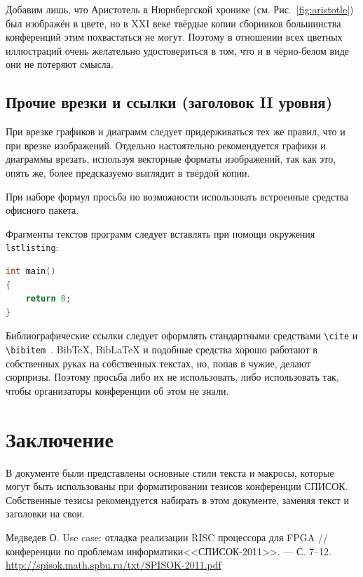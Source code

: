 \documentclass{spisok-article}
\begin{document}
Добавим лишь, что Аристотель в Нюрнбергской хронике
(см. Рис.~\ref{fig:aristotle}) был изображён в цвете, но в XXI веке
твёрдые копии сборников большинства конференций этим похвастаться не
могут. Поэтому в отношении всех цветных иллюстраций очень желательно
удостовериться в том, что и в чёрно-белом виде они не потеряют смысла.

\subsection{Прочие врезки и ссылки (заголовок II уровня)}

При врезке графиков и диаграмм следует придерживаться тех же правил,
что и при врезке изображений. Отдельно настоятельно рекомендуется
графики и диаграммы врезать, используя векторные форматы изображений,
так как это, опять же, более предсказуемо выглядит в твёрдой копии.

При наборе формул просьба по возможности использовать встроенные
средства офисного пакета.

Фрагменты текстов программ следует вставлять при помощи окружения
\texttt{lstlisting}:

\begin{lstlisting}[language=C]
int main()
{
    return 0;
}
\end{lstlisting}

Библиографические ссылки следует оформлять стандартными средствами
\texttt{\textbackslash{}cite} и
\texttt{\textbackslash{}bibitem}~\cite{medvedev2011}. BibTeX, BibLaTeX
и подобные средства хорошо работают в собственных руках на собственных
текстах, но, попав в чужие, делают сюрпризы.  Поэтому просьба либо их
не использовать, либо использовать так, чтобы организаторы конференции
об этом не знали.

\section{Заключение}

В документе были представлены основные стили текста и макросы, которые
могут быть использованы при форматировании тезисов конференции СПИСОК.
Собственные тезисы рекомендуется набирать в этом документе, заменяя
текст и заголовки на свои.

\begin{thebibliography}{8}

 Медведев О. Use case: отладка реализации RISC
  процессора для FPGA // %
  конференции по проблемам информатики<<СПИСОК-2011>>. --- %
  С. 7--12.
  \href{http://spisok.math.spbu.ru/txt/SPISOK-2011.pdf}{http://spisok.math.spbu.ru/txt/SPISOK-2011.pdf}

\end{thebibliography}
\end{document}
